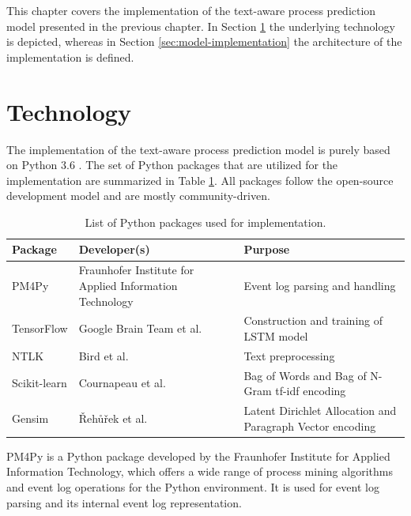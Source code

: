This chapter covers the implementation of the text-aware process prediction model presented in the previous chapter.
In Section \ref{sec:technology} the underlying technology is depicted, whereas in Section \ref{sec:model-implementation} the architecture of the implementation is defined.

\section{Technology}\label{sec:technology}

The implementation of the text-aware process prediction model is purely based on Python 3.6 \cite{python}.
The set of Python packages that are utilized for the implementation are summarized in Table \ref{tab:packages}.
All packages follow the open-source development model and are mostly community-driven.

\begin{table}[!htbp]
	\begin{tabularx}{\textwidth}{l p{4.5cm} p{6.6cm} }
		\toprule
		\textbf{Package} & \textbf{Developer(s)} & \textbf{Purpose}  \\
		\midrule
		PM4Py \cite{DBLP:journals/corr/abs-1905-06169}   &  Fraunhofer Institute for Applied Information Technology &  Event log parsing and handling\\
		TensorFlow \cite{DBLP:journals/corr/AbadiABBCCCDDDG16} &  Google Brain Team et al.& Construction and training of LSTM model \\
		NTLK \cite{DBLP:books/daglib/0022921} & Bird et al. & Text preprocessing\\
		Scikit-learn \cite{DBLP:journals/jmlr/PedregosaVGMTGBPWDVPCBPD11} & Cournapeau et al.& Bag of Words and Bag of N-Gram tf-idf encoding \\
		Gensim \cite{rehurek_lrec} & Řehůřek et al. & Latent Dirichlet Allocation and Paragraph Vector encoding \\
		 \bottomrule
	\end{tabularx}
	\caption[List of Python packages used for implementation]{List of Python packages used for implementation.}
	\label{tab:packages}
\end{table}

PM4Py \cite{DBLP:journals/corr/abs-1905-06169} is a Python package developed by the Fraunhofer Institute for Applied Information Technology, which offers a wide range of process mining algorithms and event log operations for the Python environment.
It is used for event log parsing and its internal event log representation.

